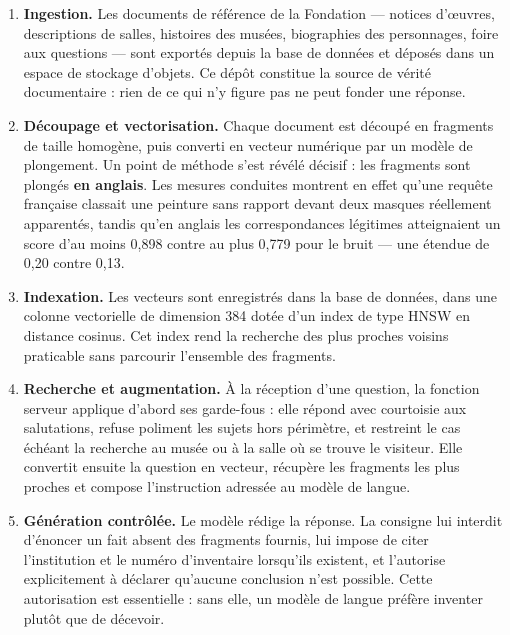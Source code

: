 \begin{enumerate}
  \item \textbf{Ingestion.} Les documents de référence de la Fondation —
        notices d'œuvres, descriptions de salles, histoires des musées,
        biographies des personnages, foire aux questions — sont exportés depuis
        la base de données et déposés dans un espace de stockage d'objets. Ce
        dépôt constitue la source de vérité documentaire : rien de ce qui n'y
        figure pas ne peut fonder une réponse.

  \item \textbf{Découpage et vectorisation.} Chaque document est découpé en
        fragments de taille homogène, puis converti en vecteur numérique par un
        modèle de plongement. Un point de méthode s'est révélé décisif : les
        fragments sont plongés \textbf{en anglais}. Les mesures conduites
        montrent en effet qu'une requête française classait une peinture sans
        rapport devant deux masques réellement apparentés, tandis qu'en anglais
        les correspondances légitimes atteignaient un score d'au moins 0,898
        contre au plus 0,779 pour le bruit — une étendue de 0,20 contre 0,13.

  \item \textbf{Indexation.} Les vecteurs sont enregistrés dans la base de
        données, dans une colonne vectorielle de dimension 384 dotée d'un index
        de type HNSW en distance cosinus. Cet index rend la recherche des plus
        proches voisins praticable sans parcourir l'ensemble des fragments.

  \item \textbf{Recherche et augmentation.} À la réception d'une question, la
        fonction serveur applique d'abord ses garde-fous : elle répond avec
        courtoisie aux salutations, refuse poliment les sujets hors périmètre,
        et restreint le cas échéant la recherche au musée ou à la salle où se
        trouve le visiteur. Elle convertit ensuite la question en vecteur,
        récupère les fragments les plus proches et compose l'instruction
        adressée au modèle de langue.

  \item \textbf{Génération contrôlée.} Le modèle rédige la réponse. La consigne
        lui interdit d'énoncer un fait absent des fragments fournis, lui impose
        de citer l'institution et le numéro d'inventaire lorsqu'ils existent, et
        l'autorise explicitement à déclarer qu'aucune conclusion n'est possible.
        Cette autorisation est essentielle : sans elle, un modèle de langue
        préfère inventer plutôt que de décevoir.
\end{enumerate}

